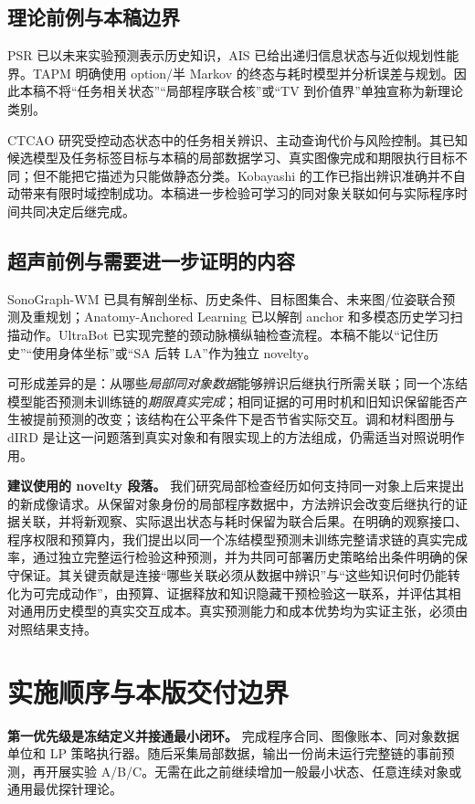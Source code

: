 \documentclass[11pt,a4paper,fontset=fandol]{ctexart}
\theoremstyle{definition}\newtheorem{definition}[theorem]{定义}
\theoremstyle{remark}\newtheorem{remark}[theorem]{说明}
\numberwithin{equation}{section}
\begin{document}
\subsection{理论前例与本稿边界}
PSR 已以未来实验预测表示历史知识，AIS 已给出递归信息状态与近似规划性能界\cite{psr,ais}。TAPM 明确使用 option/半 Markov 的终态与耗时模型并分析误差与规划\cite{partial}。因此本稿不将“任务相关状态”“局部程序联合核”或“TV 到价值界”单独宣称为新理论类别。

CTCAO 研究受控动态状态中的任务相关辨识、主动查询代价与风险控制\cite{ctcao}。其已知候选模型及任务标签目标与本稿的局部数据学习、真实图像完成和期限执行目标不同；但不能把它描述为只能做静态分类。Kobayashi 的工作已指出辨识准确并不自动带来有限时域控制成功\cite{kobayashi}。本稿进一步检验可学习的同对象关联如何与实际程序时间共同决定后继完成。

\subsection{超声前例与需要进一步证明的内容}
SonoGraph-WM 已具有解剖坐标、历史条件、目标图集合、未来图/位姿联合预测及重规划\cite{sonograph}；Anatomy-Anchored Learning 已以解剖 anchor 和多模态历史学习扫描动作\cite{anchored}。UltraBot 已实现完整的颈动脉横纵轴检查流程\cite{ultrabot}。本稿不能以“记住历史”“使用身体坐标”或“SA 后转 LA”作为独立 novelty。

可形成差异的是：从哪些\emph{局部同对象数据}能够辨识后继执行所需关联；同一个冻结模型能否预测未训练链的\emph{期限真实完成}；相同证据的可用时机和旧知识保留能否产生被提前预测的改变；该结构在公平条件下是否节省实际交互。调和材料图册与 dIRD 是让这一问题落到真实对象和有限实现上的方法组成，仍需适当对照说明作用。

\begin{corebox}
\textbf{建议使用的 novelty 段落。}
我们研究局部检查经历如何支持同一对象上后来提出的新成像请求。从保留对象身份的局部程序数据中，方法辨识会改变后继执行的证据关联，并将新观察、实际退出状态与耗时保留为联合后果。在明确的观察接口、程序权限和预算内，我们提出以同一个冻结模型预测未训练完整请求链的真实完成率，通过独立完整运行检验这种预测，并为共同可部署历史策略给出条件明确的保守保证。其关键贡献是连接“哪些关联必须从数据中辨识”与“这些知识何时仍能转化为可完成动作”，由预算、证据释放和知识隐藏干预检验这一联系，并评估其相对通用历史模型的真实交互成本。真实预测能力和成本优势均为实证主张，必须由对照结果支持。
\end{corebox}

\section{实施顺序与本版交付边界}
\label{sec:final}
\textbf{第一优先级是冻结定义并接通最小闭环。} 完成程序合同、图像账本、同对象数据单位和 LP 策略执行器。随后采集局部数据，输出一份尚未运行完整链的事前预测，再开展实验 A/B/C。无需在此之前继续增加一般最小状态、任意连续对象或通用最优探针理论。
\end{document}
